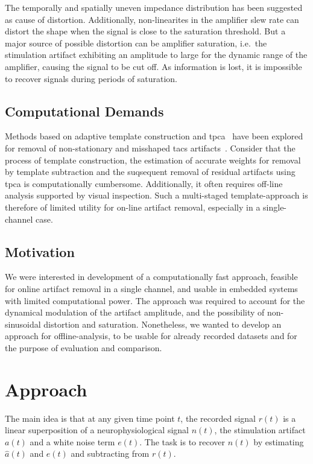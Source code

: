 \documentclass[a4paper]{article}
\begin{document}
The temporally and spatially uneven impedance distribution has been suggested as cause of distortion.
Additionally, non-linearites in the amplifier slew rate can distort the shape when the signal is close to the saturation threshold.
But a major source of possible distortion can be  amplifier saturation, i.e.\ the stimulation artifact exhibiting an amplitude to large for the dynamic range of the amplifier, causing the signal to be cut off. As information is lost, it is impossible to recover signals during periods of saturation.

\subsection{Computational Demands}

Methods based on adaptive template construction and \gls{tpca}~\citep{Niazy_2005} have been explored for removal of  non-stationary and misshaped \gls{tacs} artifacts~\citep{Helfrich_2014}.
Consider that the process of template construction, the estimation of accurate weights for removal by template subtraction and the suqsequent removal of residual artifacts using \gls{tpca} is computationally cumbersome. Additionally, it often requires off-line analysis supported by visual inspection.
Such a multi-staged template-approach is therefore of limited utility for on-line artifact removal, especially in a single-channel case.

\subsection{Motivation}

We were interested in development of a computationally fast approach, feasible for online artifact removal in a single channel, and usable in embedded systems with limited computational power.
The approach was required to account for the dynamical modulation of the artifact amplitude, and the possibility of non-sinusoidal distortion and saturation.
Nonetheless, we wanted to develop an approach for offline-analysis, to be usable for already recorded datasets and for the purpose of evaluation and comparison.

\section{Approach}

The main idea is that at any given time point $t$, the recorded signal $r(t)$ is a linear super\-position of a neurophysiological signal $n(t)$, the stimulation artifact $a(t)$ and a white noise term $e(t)$. The task is to recover $n(t)$ by estimating $\hat{a}(t)$ and $e(t)$ and subtracting from $r(t)$.
\end{document}
